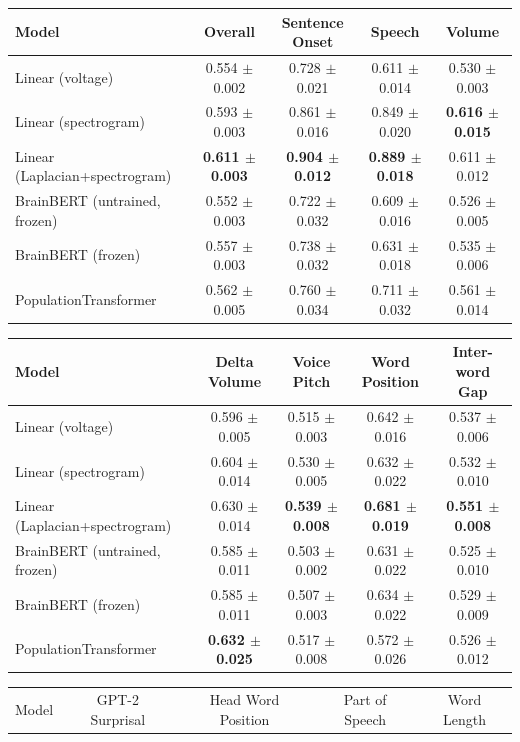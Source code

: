 \begin{table}[h]
\centering
\begin{tabular}{lcccc}
\hline
Model & Overall & Sentence Onset & Speech & Volume \\
\hline
Linear (voltage) & 0.554 $\pm$ 0.002 & 0.728 $\pm$ 0.021 & 0.611 $\pm$ 0.014 & 0.530 $\pm$ 0.003 \\
Linear (spectrogram) & 0.593 $\pm$ 0.003 & 0.861 $\pm$ 0.016 & 0.849 $\pm$ 0.020 & \textbf{0.616 $\pm$ 0.015} \\
Linear (Laplacian+spectrogram) & \textbf{0.611 $\pm$ 0.003} & \textbf{0.904 $\pm$ 0.012} & \textbf{0.889 $\pm$ 0.018} & 0.611 $\pm$ 0.012 \\
BrainBERT (untrained, frozen) & 0.552 $\pm$ 0.003 & 0.722 $\pm$ 0.032 & 0.609 $\pm$ 0.016 & 0.526 $\pm$ 0.005 \\
BrainBERT (frozen) & 0.557 $\pm$ 0.003 & 0.738 $\pm$ 0.032 & 0.631 $\pm$ 0.018 & 0.535 $\pm$ 0.006 \\
PopulationTransformer & 0.562 $\pm$ 0.005 & 0.760 $\pm$ 0.034 & 0.711 $\pm$ 0.032 & 0.561 $\pm$ 0.014 \\
\hline
\end{tabular}
\hspace{1em}
\begin{tabular}{lcccc}
\hline
Model & Delta Volume & Voice Pitch & Word Position & Inter-word Gap \\
\hline
Linear (voltage) & 0.596 $\pm$ 0.005 & 0.515 $\pm$ 0.003 & 0.642 $\pm$ 0.016 & 0.537 $\pm$ 0.006 \\
Linear (spectrogram) & 0.604 $\pm$ 0.014 & 0.530 $\pm$ 0.005 & 0.632 $\pm$ 0.022 & 0.532 $\pm$ 0.010 \\
Linear (Laplacian+spectrogram) & 0.630 $\pm$ 0.014 & \textbf{0.539 $\pm$ 0.008} & \textbf{0.681 $\pm$ 0.019} & \textbf{0.551 $\pm$ 0.008} \\
BrainBERT (untrained, frozen) & 0.585 $\pm$ 0.011 & 0.503 $\pm$ 0.002 & 0.631 $\pm$ 0.022 & 0.525 $\pm$ 0.010 \\
BrainBERT (frozen) & 0.585 $\pm$ 0.011 & 0.507 $\pm$ 0.003 & 0.634 $\pm$ 0.022 & 0.529 $\pm$ 0.009 \\
PopulationTransformer & \textbf{0.632 $\pm$ 0.025} & 0.517 $\pm$ 0.008 & 0.572 $\pm$ 0.026 & 0.526 $\pm$ 0.012 \\
\hline
\end{tabular}
\hspace{1em}
\begin{tabular}{lcccc}
\hline
Model & GPT-2 Surprisal & Head Word Position & Part of Speech & Word Length \\

\end{tabular}
\end{table}
